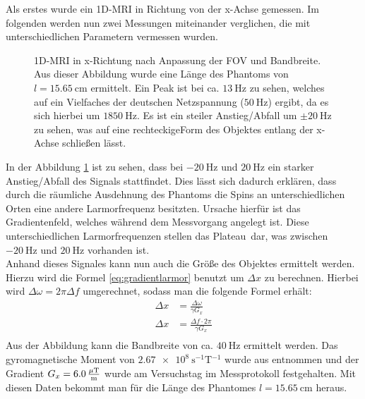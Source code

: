 Als erstes wurde ein 1D-MRI in Richtung von der x-Achse gemessen.
Im folgenden werden nun zwei Messungen miteinander verglichen, die mit unterschiedlichen Parametern vermessen wurden.  
\begin{figure}[H]
    \centering
    
    \caption[1D-MRI in x-Richtung nach Anpassung der FOV und Bandbreite]{1D-MRI in x-Richtung nach Anpassung der FOV und Bandbreite. Aus dieser Abbildung wurde eine Länge des Phantoms von $l=\SI{15,65}{\centi\m}$ ermittelt. Ein Peak ist bei ca. $\SI{13}{\hertz}$ zu sehen, welches auf ein Vielfaches der deutschen Netzspannung ($\SI{50}{\hertz}$) ergibt, da es sich hierbei um $\SI{1850}{\hertz}$. Es ist ein steiler Anstieg/Abfall um $\pm \SI{20}{\hertz}$ zu sehen, was auf eine \glqq rechteckige\grqq Form des Objektes entlang der x-Achse schließen lässt.\label{fig:1Dx}}
\end{figure}
In der Abbildung \ref{fig:1Dx} ist zu sehen, dass bei $\SI{-20}{\hertz}$ und $\SI{20}{\hertz}$ ein starker Anstieg/Abfall des Signals stattfindet. Dies lässt sich dadurch erklären, dass durch die räumliche Ausdehnung des Phantoms die Spins an unterschiedlichen Orten eine andere Larmorfrequenz besitzten. Ursache hierfür ist das Gradientenfeld, welches während dem Messvorgang angelegt ist. Diese unterschiedlichen Larmorfrequenzen stellen das \glqq Plateau\grqq \, dar, was zwischen $\SI{-20}{\hertz}$ und $\SI{20}{\hertz}$ vorhanden ist.\\
Anhand dieses Signales kann  nun auch die Größe des Objektes ermittelt werden. Hierzu wird die Formel \ref{eq:gradientlarmor} benutzt um $\Delta x$ zu berechnen. Hierbei wird $\Delta\omega= 2\pi \Delta f$ umgerechnet, sodass man die folgende Formel erhält:
\begin{align}
    \Delta x&=\frac{\Delta\omega}{\gamma G_x}\\
    \Delta x&=\frac{\Delta f \cdot 2\pi}{\gamma G_x}\\
\end{align}\label{eq:FOV}
Aus der Abbildung kann die Bandbreite von ca. $\SI{40}{\hertz}$ ermittelt werden. Das gyromagnetische Moment von $\SI{2.67e8}{\s^{-1}\tesla^{-1}}$ wurde aus \cite{Schmidt} entnommen und der Gradient $G_x=\SI{6,0}{\frac{\mu\tesla}{\m}}$ wurde am Versuchstag im Messprotokoll festgehalten. Mit diesen Daten bekommt man für die Länge des Phantomes $l=\SI{15,65}{\centi\m}$ heraus.\\
